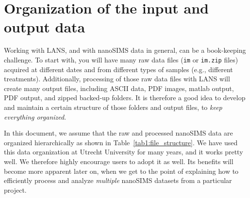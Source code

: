 \documentclass[a4paper, 11pt]{article}
\newcommand{\ttt}[1]{\texttt{#1}}
\begin{document}

\section{Organization of the input and output data}

Working with LANS, and with nanoSIMS data in general, can be a book-keeping challenge. To start with, you will have many raw data files (\ttt{im} or \ttt{im.zip} files) acquired at different dates and from different types of samples (e.g., different treatments). Additionally, processing of those raw data files with LANS will create many output files, including ASCII data, PDF images, matlab output, PDF output, and zipped backed-up folders. It is therefore a good idea to develop and maintain a certain structure of those folders and output files, to \emph{keep everything organized}. 

In this document, we assume that the raw and processed nanoSIMS data are organized hierarchically as shown in Table~\ref{tab1:file_structure}. We have used this data organization at Utrecht University for many years, and it works pretty well. We therefore highly encourage users to adopt it as well. Its benefits will become more apparent later on, when we get to the point of explaining how to efficiently process and analyze \emph{multiple} nanoSIMS datasets from a particular project.
\end{document}
